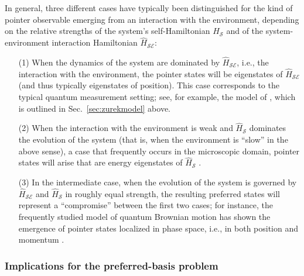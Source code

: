 \documentclass[rmp,aps,amsmath,amsfonts,noshowkeys,noshowpacs,12pt]{revtex4}
\begin{document}
In general, three different cases have typically been distinguished
\citep[for example, in][]{Paz:1999:vv} for the kind of pointer
observable emerging from an interaction with the environment,
depending on the relative strengths of the system's self-Hamiltonian
$\widehat{H}_{\mathcal{S}}$ and of the system-environment interaction
Hamiltonian $\widehat{H}_\mathcal{SE}$:
%
\begin{enumerate} 
  
\item[(1)] When the dynamics of the system are dominated by
  $\widehat{H}_\mathcal{SE}$, i.e., the interaction with the
  environment, the pointer states will be eigenstates of
  $\widehat{H}_\mathcal{SE}$ (and thus typically eigenstates of
  position). This case corresponds to the typical quantum measurement
  setting; see, for example, the model of
  \citet{Zurek:1981:dd,Zurek:1982:tv}, which is outlined in
  Sec.~\ref{sec:zurekmodel} above.
  
\item[(2)] When the interaction with the environment is weak and
  $\widehat{H}_\mathcal{S}$ dominates the evolution of the system
  (that is, when the environment is ``slow'' in the above sense), a
  case that frequently occurs in the microscopic domain, pointer
  states will arise that are energy eigenstates of
  $\widehat{H}_\mathcal{S}$ \citep{Paz:1999:vv}.
  
\item[(3)] In the intermediate case, when the evolution of the system is
  governed by $\widehat{H}_\mathcal{SE}$ and $\widehat{H}_\mathcal{S}$
  in roughly equal strength, the resulting preferred states will
  represent a ``compromise'' between the first two cases; for
  instance, the frequently studied model of quantum Brownian motion
  has shown the emergence of pointer states localized in phase space,
  i.e., in both position and momentum
  \citep{Zurek:1993:qq,Zurek:2002:ii,Joos:2003:jh,Unruh:1989:rc,Eisert:2003:ib}.
  
\end{enumerate}


\subsubsection{\label{sec:einsel-mp}Implications for the
  preferred-basis problem}
\end{document}
